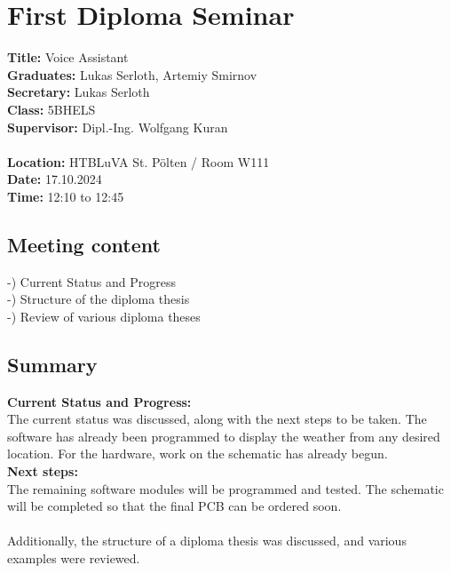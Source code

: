
\section{First Diploma Seminar}
\textbf{Title:} Voice Assistant\\

\noindent\textbf{Graduates:} Lukas Serloth, Artemiy Smirnov\\

\noindent\textbf{Secretary:} Lukas Serloth\\

\noindent\textbf{Class:} 5BHELS\\

\noindent\textbf{Supervisor:} Dipl.-Ing. Wolfgang Kuran\\ \\

\noindent\textbf{Location:} HTBLuVA St. Pölten / Room W111\\

\noindent\textbf{Date:} 17.10.2024\\

\noindent\textbf{Time:} 12:10 to 12:45\\ 

\subsection{Meeting content}
-) Current Status and Progress \\ -) Structure of the diploma thesis \\ -) Review of various diploma theses \\

\subsection{Summary}
\textbf{Current Status and Progress:\\} 
    The current status was discussed, along with the next steps to be taken.
    The software has already been programmed to display the weather from any desired location.
    For the hardware, work on the schematic has already begun.\\

\noindent\textbf{Next steps:\\}
    The remaining software modules will be programmed and tested.
    The schematic will be completed so that the final PCB can be ordered soon.\\
    \\Additionally, the structure of a diploma thesis was discussed, and various examples were reviewed.

